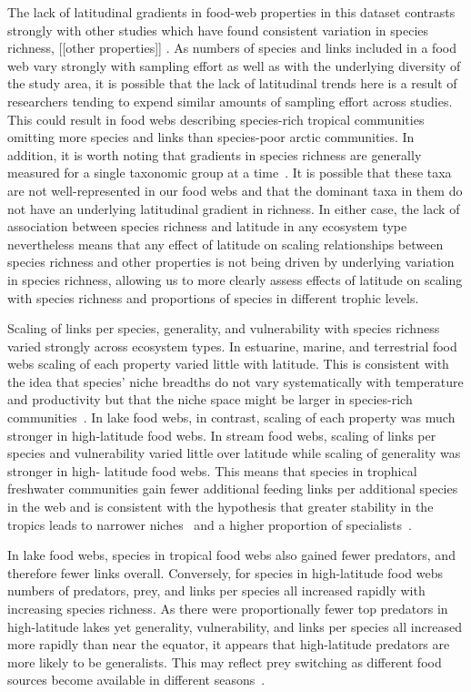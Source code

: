\documentclass[12pt]{article}
\begin{document}
The lack of latitudinal gradients in food-web properties in this dataset contrasts
strongly with other studies which have found consistent variation in species richness,
[[other properties]] \citep{}. As numbers of species and links included in a food web
vary strongly with sampling effort as well as with the underlying diversity of the study
area, it is possible that the lack of latitudinal trends here is a result of researchers
tending to expend similar amounts of sampling effort across studies. This could result in
food webs describing species-rich tropical communities omitting more species and links
than species-poor arctic communities. In addition, it is worth noting that gradients in
species richness are generally measured for a single taxonomic group at a time~\citep{}.
It is possible that these taxa are not well-represented in our food webs and that the
dominant taxa in them do not have an underlying latitudinal gradient in richness. In
either case, the lack of association between species richness
and latitude in any ecosystem type nevertheless means that any effect of latitude on scaling relationships
between species richness and other properties is not being driven by underlying variation in
species richness, allowing us to more clearly assess effects of latitude on scaling with 
species richness and proportions of species in different trophic levels.


Scaling of links per species, generality, and vulnerability with species
richness varied strongly across ecosystem types. In estuarine, marine, and
terrestrial food webs scaling of each property varied little with latitude.
This is consistent with the idea that species' niche breadths do not vary
systematically with temperature and productivity but that the niche space
might be larger in species-rich communities~\citep{Davies2007}. In lake food
webs, in contrast, scaling of each property was much stronger in high-latitude
food webs. In stream food webs, scaling of links per species and vulnerability
varied little over latitude while scaling of generality was stronger in high-
latitude food webs. This means that species in trophical freshwater
communities gain fewer additional feeding links per additional species in the
web and is consistent with the hypothesis that greater stability in the
tropics leads to narrower niches~\citep{Brown2004} and a higher proportion of
specialists~\citep{}.


In lake food webs, species in tropical food webs also gained fewer predators,
and therefore fewer links overall. Conversely, for species in high-latitude
food webs numbers of predators, prey, and links per species all increased
rapidly with increasing species richness.
As there were proportionally fewer top predators in high-latitude lakes yet
generality, vulnerability, and links per species all increased more rapidly than
near the equator, it appears that high-latitude predators are more likely to be 
generalists. This may reflect prey switching as
different food sources become available in different seasons~\citep{}.
\end{document}

